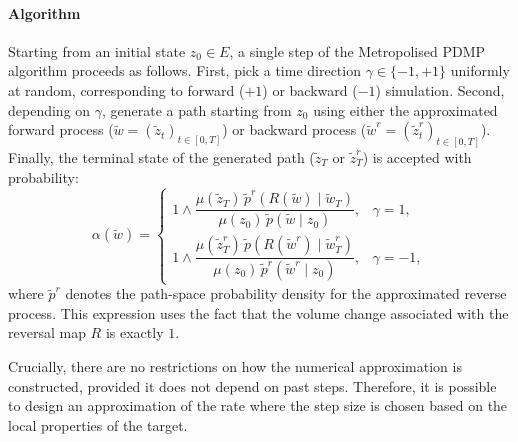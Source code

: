 \documentclass{article}
\begin{document}
\paragraph{Algorithm}
Starting from an initial state $z_0 \in E$, a single step of the Metropolised PDMP algorithm proceeds as follows. First, pick a time direction $\gamma \in \{-1, +1\}$ uniformly at random, corresponding to forward ($+1$) or backward ($-1$) simulation. Second, depending on $\gamma$, generate a path starting from $z_0$ using either the approximated forward process ($\tilde{w} = (\tilde{z}_t)_{t \in [0,T]}$) or backward process ($\tilde{w}^r = (\tilde{z}_t^r)_{t \in [0,T]}$). Finally, the terminal state of the generated path ($\tilde{z}_T$ or $\tilde{z}_T^r$) is accepted with probability:
\begin{equation}
    \label{eq:acceptance-proba}
    \alpha(\tilde{w}) =
    \begin{cases}
    1 \wedge \dfrac{\mu(\tilde{z}_T)\,\tilde{p}^r(R(\tilde{w})\mid \tilde{w}_T)}
    {\mu(z_0)\,\tilde{p}(\tilde{w} \mid z_0)}, & \gamma = 1, \\[1.5em]
    1 \wedge \dfrac{\mu(\tilde{z}_T^r)\,\tilde{p}(R(\tilde{w}^r)\mid \tilde{w}_T^r)}
    {\mu(z_0)\,\tilde{p}^r(\tilde{w}^r \mid z_0)}, & \gamma = -1,
    \end{cases}
\end{equation}
where $\tilde{p}^r$ denotes the path-space probability density for the approximated reverse process. This expression uses the fact that the volume change associated with the reversal map $R$ is exactly $1$.

Crucially, there are no restrictions on how the numerical approximation is constructed, provided it does not depend on past steps. Therefore, it is possible to design an approximation of the rate where the step size is chosen based on the local properties of the target.
\end{document}
